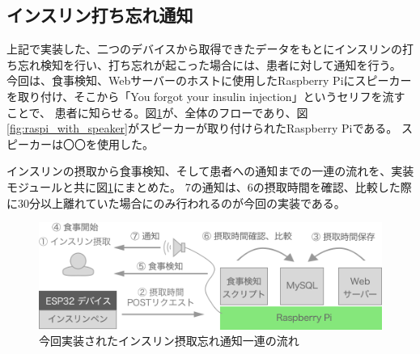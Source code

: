 \subsection{インスリン打ち忘れ通知}

上記で実装した、二つのデバイスから取得できたデータをもとにインスリンの打ち忘れ検知を行い、打ち忘れが起こった場合には、患者に対して通知を行う。
今回は、食事検知、Webサーバーのホストに使用したRaspberry Piにスピーカーを取り付け、そこから「You forgot your insulin injection」というセリフを流すことで、
患者に知らせる。図\ref{fig:system_flow}が、全体のフローであり、図\ref{fig:raspi_with_speaker}がスピーカーが取り付けられたRaspberry Piである。
スピーカーは〇〇を使用した。

インスリンの摂取から食事検知、そして患者への通知までの一連の流れを、実装モジュールと共に図\ref{fig:system_flow}にまとめた。
7の通知は、6の摂取時間を確認、比較した際に30分以上離れていた場合にのみ行われるのが今回の実装である。

\begin{figure}[htbp]
  \caption{今回実装されたインスリン摂取忘れ通知一連の流れ}
  \label{fig:system_flow}
  \begin{center}
    \includegraphics[bb=0 0 1000 600,width=15cm]{assets/system_flow_with_modules.png}
  \end{center}
\end{figure}

